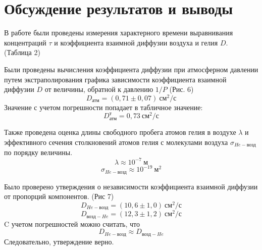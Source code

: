 \documentclass[a4paper,12pt]{article}
\theoremstyle{plain} %
\theoremstyle{definition} %
\theoremstyle{remark} %
\begin{document}
\section{Обсуждение результатов и выводы}
В работе были проведены измерения характерного времени выравнивания концентраций $\tau$ и коэффициента взаимной диффузии воздуха и гелия $D$. \\(Таблица 2)

Были проведены вычисления коэффициента диффузии при атмосферном давлении путем экстраполирования графика зависимости коэффициента взаимной диффузии $D$ от величины, обратной к давлению $1/P$ (Рис. 6)
\[D_\text{атм} = (0,71\pm0,07)\ \text{см}^2/\text{с}\] 
Значение с учетом погрешности попадает в табличное значение:
\[D_\text{атм}^\text{т} = 0,73\ \text{см}^2/\text{с} \]

Также проведена оценка длины свободного пробега атомов гелия в воздухе $\lambda$ и эффективного сечения столкновений атомов гелия с молекулами воздуха $\sigma_{He - \text{возд}}$ по порядку величины.
\[\lambda \approx 10^{-7}\ \text{м}\]
\[\sigma_{He - \text{возд}} \approx  10^{-19}\ \text{м}^2\]

Было проверено утверждения о независимости коэффициента взаимной диффузии от пропорций компонентов. (Рис 7)
\[ D_{He - \text{возд}} = (10,6\pm1,0)\ \text{см}^2/\text{с}  \]
\[ D_{\text{возд} - He} = (12,3\pm1,2)\ \text{см}^2/\text{с}  \]
C учетом погрешностей можно считать, что
\[D_{He - \text{возд}} \approx D_{\text{возд} - He}\]
Следовательно, утверждение верно.
\end{document}
